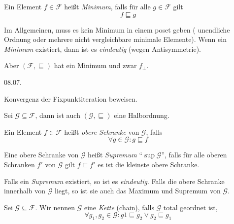 \par\medskip
\begin{definition}
    Ein Element $f \in \mathcal{F}$ heißt \emph{Minimum}, falls für alle $g \in \mathcal{F}$ gilt \[
    f \sqsubseteq g
    \]
\end{definition}

\begin{observations}
    Im Allgemeinen, muss es kein Minimum in einem poset geben (\zb{} unendliche Ordnung oder mehrere nicht vergleichbare minimale Elemente). Wenn ein \emph{Minimum} existiert, dann ist es \emph{eindeutig} (wegen Antisymmetrie).

    Aber $(\mathcal{F}, \sqsubseteq)$ hat ein Minimum und zwar $f_{\bot}$.
\end{observations}



\newpage
\hfill 08.07.

\begin{remark}
    Konvergenz der Fixpunktiteration beweisen.
\end{remark}

\begin{definition}
    Sei $\mathcal{G} \subseteq \mathcal{F}$, dann ist auch $(\mathcal{G}, \sqsubseteq)$ eine Halbordnung.

    Ein Element $f \in \mathcal{F}$ heißt \emph{obere Schranke} von $\mathcal{G}$, falls \[
        \forall g \in \mathcal{G}: g \sqsubseteq f
    \]

    Eine obere Schranke von $\mathcal{G}$ heißt \emph{Supremum} ``$\sup \mathcal{G}$'', falls für alle oberen Schranken $f'$ von $\mathcal{G}$ gilt $f \sqsubseteq f'$ \dh{} es ist die kleinste obere Schranke.

    Falls ein \emph{Supremum} existiert, so ist es \emph{eindeutig}. Falls die obere Schranke innerhalb von $\mathcal{G}$ liegt, so ist sie auch das Maximum und Supremum von $\mathcal{G}$.
\end{definition}

\par\bigskip
\begin{definition}
    Sei $\mathcal{G} \subseteq \mathcal{F}$. Wir nennen $\mathcal{G}$ eine \emph{Kette} (chain), falls $\mathcal{G}$ total geordnet ist, \dh{} \[
        \forall g_1, g_2 \in \mathcal{G}: g1 \sqsubseteq g_2 \vee g_2 \sqsubseteq g_1
    \]
\end{definition}

